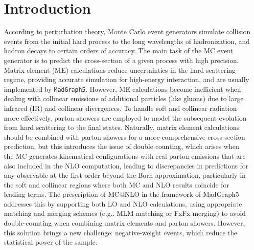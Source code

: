 \documentclass[NOTE, REPORT=true, atlasdraft=true, USenglish]{atlasdoc}
\begin{document}
\maketitle

\tableofcontents



\chapter{Introduction}
\label{chap:introduction}





According to perturbation theory, Monte Carlo event generators simulate collision events from the initial hard process to the long wavelengths of hadronization, and hadron decays to certain orders of accuracy. The main task of the MC event generator is to predict the cross-section of a given process with high precision. Matrix element (ME) calculations reduce uncertainties in the hard scattering regime, providing accurate simulation for high-energy interaction, and are usually implemented by \texttt{MadGraph5}. However, ME calculations become inefficient when dealing with collinear emissions of additional particles (like gluons) due to large infrared (IR) and collinear divergences. To handle soft and collinear radiation more effectively, parton showers are employed to model the subsequent evolution from hard scattering to the final states. Naturally, matrix element calculations should be combined with parton showers for a more comprehensive cross-section prediction, but this introduces the issue of double counting, which arises when the MC generates kinematical configurations with real parton emissions that are also included in the NLO computation, leading to discrepancies in predictions for any observable at the first order beyond the Born approximation, particularly in the soft and collinear regions where both MC and NLO results coincide for leading terms. The prescription of MC@NLO\cite{NLO_matching} in the framework of MadGraph5 addresses this by supporting both LO and NLO calculations\cite{MadGraph5}, using appropriate matching and merging schemes (e.g., MLM matching or FxFx merging\cite{merging}) to avoid double-counting when combining matrix elements and parton showers. However, this solution brings a new challenge: negative-weight events, which reduce the statistical power of the sample.
\end{document}
